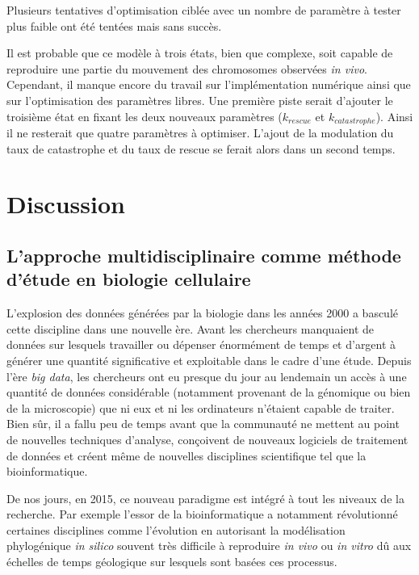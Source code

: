 \documentclass[12pt,a4paper,twoside,openright]{book}
\begin{document}
Plusieurs tentatives d'optimisation ciblée avec un nombre de paramètre à
tester plus faible ont été tentées mais sans succès.

Il est probable que ce modèle à trois états, bien que complexe, soit
capable de reproduire une partie du mouvement des chromosomes observées
\emph{in vivo}. Cependant, il manque encore du travail sur
l'implémentation numérique ainsi que sur l'optimisation des paramètres
libres. Une première piste serait d'ajouter le troisième état en fixant
les deux nouveaux paramètres (\(k_{rescue}\) et \(k_{catastrophe}\)).
Ainsi il ne resterait que quatre paramètres à optimiser. L'ajout de la
modulation du taux de catastrophe et du taux de rescue se ferait alors
dans un second temps.

\chapter{Discussion}\label{discussion}

\section{L'approche multidisciplinaire comme méthode d'étude en biologie
cellulaire}\label{lapproche-multidisciplinaire-comme-muxe9thode-duxe9tude-en-biologie-cellulaire}

L'explosion des données générées par la biologie dans les années 2000 a
basculé cette discipline dans une nouvelle ère. Avant les chercheurs
manquaient de données sur lesquels travailler ou dépenser énormément de
temps et d'argent à générer une quantité significative et exploitable
dans le cadre d'une étude. Depuis l'ère \emph{big data}, les chercheurs
ont eu presque du jour au lendemain un accès à une quantité de données
considérable (notamment provenant de la génomique ou bien de la
microscopie) que ni eux et ni les ordinateurs n'étaient capable de
traiter. Bien sûr, il a fallu peu de temps avant que la communauté ne
mettent au point de nouvelles techniques d'analyse, conçoivent de
nouveaux logiciels de traitement de données et créent même de nouvelles
disciplines scientifique tel que la bioinformatique.

De nos jours, en 2015, ce nouveau paradigme est intégré à tout les
niveaux de la recherche. Par exemple l'essor de la bioinformatique a
notamment révolutionné certaines disciplines comme l'évolution en
autorisant la modélisation phylogénique \emph{in silico} souvent très
difficile à reproduire \emph{in vivo} ou \emph{in vitro} dû aux échelles
de temps géologique sur lesquels sont basées ces processus.
\end{document}
